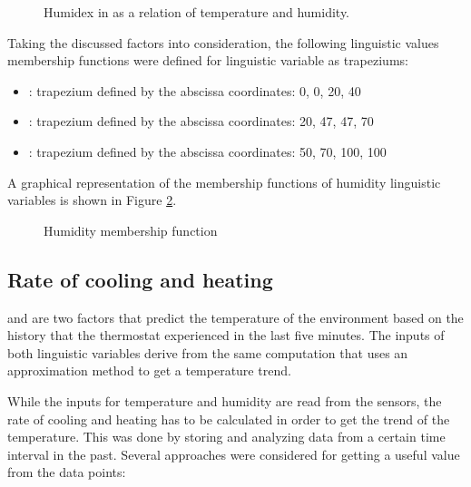 \begin{figure}[h!]
    \label{fig:humidex}
    \centerline{}
    \caption[Humidex in as a relation of temperature and humidity]{Humidex in as a relation of temperature and
                                                                  humidity.}
    \label{fig:humidex}
\end{figure}


\qquad Taking the discussed factors into consideration, the following linguistic values membership functions
were defined for  linguistic variable as trapeziums:

\begin{itemize}
    \item {}: trapezium defined by the abscissa coordinates: 0, 0, 20, 40
    \item {}: trapezium defined by the abscissa coordinates: 20, 47, 47, 70
    \item {}: trapezium defined by the abscissa coordinates: 50, 70, 100, 100
\end{itemize}

\qquad A graphical representation of the membership functions of humidity linguistic variables is
shown in Figure \ref{fig:humidity_mf}.

\begin{figure}[h!]
    \label{fig:humidity_mf}
    \centerline{}
    \caption[Humidity membership function]{Humidity membership function}
    \label{fig:humidity_mf}
\end{figure}
\clearpage

\subsection{Rate of cooling and heating}

\qquad {} and  are two factors that predict the temperature of the
environment based on the history that the thermostat experienced in the last five minutes. The inputs of both
linguistic variables derive from the same computation that uses an approximation method to get a temperature
trend.

\qquad While the inputs for temperature and humidity are read from the sensors, the rate of cooling and
heating has to be calculated in order to get the trend of the temperature. This was done by storing and
analyzing data from a certain time interval in the past. Several approaches were considered for getting a
useful value from the data points:

